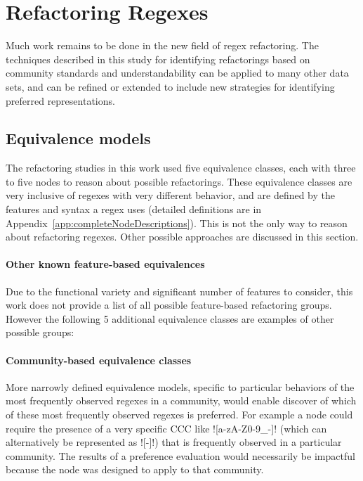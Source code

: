 \section{Refactoring Regexes}
Much work remains to be done in the new field of regex refactoring.  The techniques described in this study for identifying refactorings based on community standards and understandability can be applied to many other data sets, and can be refined or extended to include new strategies for identifying preferred representations.

\subsection{Equivalence models}
\label{dis:equivalenceModels}
The refactoring studies in this work used five equivalence classes, each with three to five nodes to reason about possible refactorings.  These equivalence classes are very inclusive of regexes with very different behavior, and are defined by the features and syntax a regex uses (detailed definitions are in Appendix~\ref{app:completeNodeDescriptions}).  This is not the only way to reason about refactoring regexes.  Other possible approaches are discussed in this section.

\paragraph{Other known feature-based equivalences}  Due to the functional variety and significant number of features to consider, this work does not provide a list of all possible feature-based refactoring groups.  However the following 5 additional equivalence classes are examples of other possible groups:

\paragraph{Community-based equivalence classes}  More narrowly defined equivalence models, specific to particular behaviors of the most frequently observed regexes in a community, would enable discover of which of these most frequently observed regexes is preferred. For example a node could require the presence of a very specific CCC like \cverb![a-zA-Z0-9_-]! (which can alternatively be represented as \cverb![\w-]!) that is frequently observed in a particular community.  The results of a preference evaluation would necessarily be impactful because the node was designed to apply to that community.

